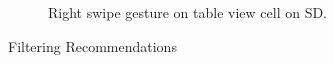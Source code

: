 \begin{figure}
\begin{subfigure}[b]{0.3\textwidth}
        \caption{Right swipe gesture on table view cell on SD.}
        \label{fig:figure47b}
    \end{subfigure}
   \caption{Filtering Recommendations}\label{fig:figure47}
\end{figure}
  

 
         


